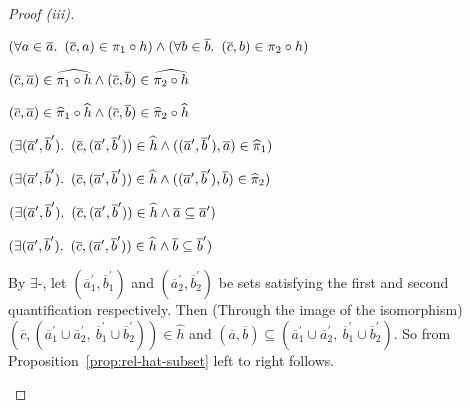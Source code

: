 \begin{prop}
\begin{proof}[Proof (iii)]
\begin{itemize}
      \step[\iffs]
        $(\forall a\in\overline{a}\ldotp~(\overline{c},a)\in\pi_1\circ h)\land(\forall b\in\overline{b}\ldotp~(\overline{c},b)\in\pi_2\circ h)$

      \step[\iffs]
        $(\overline{c},\overline{a})\in\widehat{\pi_1\circ h}\land(\overline{c},\overline{b})\in\widehat{\pi_2\circ h}$
        \marginnote{\Def-$~\widehat{\cdot}$}

      \step[\iffs]
        $(\overline{c},\overline{a})\in\widehat{\pi}_1\circ\widehat{h}\land(\overline{c},\overline{b})\in\widehat{\pi}_2\circ\widehat{h}$
        \marginnote{\Def-\ref{prop:rel-hat-comp}}

      \step[\iffs]
        $(\exists(\overline{a}^\prime,\overline{b}^\prime)\ldotp~(\overline{c},(\overline{a}^\prime,\overline{b}^\prime))\in\widehat{h}\land((\overline{a}^\prime,\overline{b}^\prime),\overline{a})\in\widehat{\pi}_1)$

      \addtolength{\itemsep}{-.4\baselineskip}
      \step[\land]
        $(\exists(\overline{a}^\prime,\overline{b}^\prime)\ldotp~(\overline{c},(\overline{a}^\prime,\overline{b}^\prime))\in\widehat{h}\land((\overline{a}^\prime,\overline{b}^\prime),\overline{b})\in\widehat{\pi}_2)$
      \addtolength{\itemsep}{.4\baselineskip}

      \step[\iffs]
        $(\exists(\overline{a}^\prime,\overline{b}^\prime)\ldotp~(\overline{c},(\overline{a}^\prime,\overline{b}^\prime))\in\widehat{h}\land\overline{a}\subseteq\overline{a}^\prime)$

      \addtolength{\itemsep}{-.4\baselineskip}
      \step[\land]
        $(\exists(\overline{a}^\prime,\overline{b}^\prime)\ldotp~(\overline{c},(\overline{a}^\prime,\overline{b}^\prime))\in\widehat{h}\land\overline{b}\subseteq\overline{b}^\prime)$
      \addtolength{\itemsep}{.4\baselineskip}

      \addtolength{\itemsep}{.5\baselineskip}
      \step
        By $\exists$-\Elim, let $(\overline{a}^\prime_1,\overline{b}^\prime_1)$ and $(\overline{a}^\prime_2,\overline{b}^\prime_2)$ be sets satisfying the first and second quantification respectively. Then (Through the image of the isomorphism) ${(\overline{c},(\overline{a}^\prime_1\cup\overline{a}^\prime_2,~\overline{b}^\prime_1\cup\overline{b}^\prime_2))\in\widehat{h}}$ and ${(\overline{a},\overline{b})\subseteq(\overline{a}^\prime_1\cup\overline{a}^\prime_2,~\overline{b}^\prime_1\cup\overline{b}^\prime_2)}$. So from Proposition~\ref{prop:rel-hat-subset} left to right follows.


\end{itemize}
\end{proof}
\end{prop}
